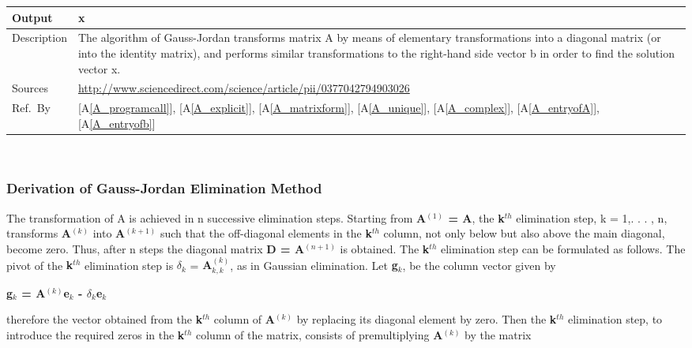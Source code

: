 \documentclass[12pt]{article}
\newcommand{\colAwidth}{0.13\textwidth}
\newcommand{\colBwidth}{0.82\textwidth}
\newcommand{\aref}[1]{A\ref{#1}}
\begin{document}
{\begin{minipage}{\textwidth}
\begin{tabular}{| p{\colAwidth} | p{\colBwidth}|}
  \hline
  Output& \textbf{x}    \\
  \hline
Description& The algorithm of Gauss-Jordan transforms matrix A by means of
elementary transformations into a diagonal matrix (or into the identity matrix),
and performs similar transformations to the right-hand side vector b in order to
find the solution vector x.
  \\
  \hline
  Sources& \url{http://www.sciencedirect.com/science/article/pii/0377042794903026}\\
  \hline
  Ref.\ By & [\aref{A_programcall}], [\aref{A_explicit}], [\aref{A_matrixform}], [\aref{A_unique}], [\aref{A_complex}], [\aref{A_entryofA}], [\aref{A_entryofb}]\\
  \hline
\end{tabular}
\end{minipage}\\


\subsubsection*{Derivation of  Gauss-Jordan Elimination Method}

The transformation of A is achieved in n successive elimination steps. Starting
from \textbf{{A$^{(1)}$} = A}, the \textbf{{k$^{th}$}} elimination step, k = 1,. . . , n,
transforms \textbf{{A$^{(k)}$}} into \textbf{{A$^{(k+1)}$}} such that the off-diagonal elements in
the \textbf{{k$^{th}$}} column, not only below but also above the main diagonal, become
zero. Thus, after n steps the diagonal matrix \textbf{D = {A$^{(n+1)}$}} is obtained. The
\textbf{{k$^{th}$}} elimination step can be formulated as follows. The pivot of
the \textbf{{k$^{th}$}} elimination step is \textbf{$\delta_k$} = \textbf{{A$^{(k)}_{k,k}$}}, as in
Gaussian elimination. Let \textbf{{g$_k$}}, be the column vector given by

\vspace{.5cm}

\textbf{{g$_k$} = {A$^{(k)}$}{e$_k$} - $\delta_k${e$_k$}}

\vspace{.5cm}

therefore the vector obtained from the \textbf{{k$^{th}$}} column of \textbf{{A$^{(k)}$}} by
replacing its diagonal element by zero. Then the \textbf{{k$^{th}$}} elimination step, to
introduce the required zeros in the \textbf{{k$^{th}$}} column of the matrix, consists of
premultiplying \textbf{{A$^{(k)}$}} by the matrix

}
\end{document}
